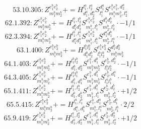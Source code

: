 \documentclass[letterpaper,10pt,fleqn,leqno,onecolumn]{article}
\begin{document}
\begin{equation} \;\;\;\;\;\;  53.10.305: Z^{e_{1}^{b}e_{2}^{b}}_{m_{1}^{b}m_{2}^{b}}+=H^{l_{1}^{a},l_{2}^{a}}_{d_{1}^{a},d_{2}^{a}}S^{d_{1}^{a}}_{l_{1}^{a}}S^{e_{1}^{b}e_{2}^{b},d_{2}^{a}}_{m_{1}^{b}m_{2}^{b},l_{2}^{a}} \end{equation}
\begin{equation} \;\;\;\;\;\;  62.1.392: Z^{e_{1}^{b}e_{2}^{b}}_{m_{1}^{b}m_{2}^{b}}+=H^{l_{1}^{b},l_{2}^{b}}_{d_{1}^{b}d_{2}^{b}}S^{e_{1}^{b}e_{2}^{b}}_{m_{1}^{b},l_{1}^{b}}S^{d_{1}^{b}d_{2}^{b}}_{m_{2}^{b},l_{2}^{b}}\cdot -1/1 \end{equation}
\begin{equation} \;\;\;\;\;\;  62.3.394: Z^{e_{1}^{b}e_{2}^{b}}_{m_{1}^{b}m_{2}^{b}}+=H^{l_{1}^{b},l_{1}^{a}}_{d_{1}^{a}d_{1}^{b}}S^{e_{1}^{b}e_{2}^{b}}_{m_{1}^{b},l_{1}^{b}}S^{d_{1}^{a}d_{1}^{b}}_{m_{2}^{b},l_{1}^{a}}\cdot -1/1 \end{equation}
\begin{equation} \;\;\;\;\;\;  63.1.400: Z^{e_{1}^{b}e_{2}^{b}}_{m_{1}^{b}m_{2}^{b}}+=H^{l_{1}^{b}l_{2}^{b}}_{d_{1}^{b}d_{2}^{b}}S^{e_{1}^{b}e_{2}^{b}}_{l_{1}^{b}l_{2}^{b}}S^{d_{1}^{b}d_{2}^{b}}_{m_{1}^{b}m_{2}^{b}} \end{equation}
\begin{equation} \;\;\;\;\;\;  64.1.403: Z^{e_{1}^{b}e_{2}^{b}}_{m_{1}^{b}m_{2}^{b}}+=H^{l_{1}^{b}l_{2}^{b}}_{d_{1}^{b},d_{2}^{b}}S^{e_{1}^{b},d_{1}^{b}}_{m_{1}^{b}m_{2}^{b}}S^{e_{2}^{b},d_{2}^{b}}_{l_{1}^{b}l_{2}^{b}}\cdot -1/1 \end{equation}
\begin{equation} \;\;\;\;\;\;  64.3.405: Z^{e_{1}^{b}e_{2}^{b}}_{m_{1}^{b}m_{2}^{b}}+=H^{l_{1}^{a}l_{1}^{b}}_{d_{1}^{b},d_{1}^{a}}S^{e_{1}^{b},d_{1}^{b}}_{m_{1}^{b}m_{2}^{b}}S^{e_{2}^{b},d_{1}^{a}}_{l_{1}^{a}l_{1}^{b}}\cdot -1/1 \end{equation}
\begin{equation} \;\;\;\;\;\;  65.1.411: Z^{e_{1}^{b}e_{2}^{b}}_{m_{1}^{b}m_{2}^{b}}+=H^{l_{1}^{b},l_{2}^{b}}_{d_{1}^{b},d_{2}^{b}}S^{e_{1}^{b},d_{1}^{b}}_{m_{1}^{b},l_{1}^{b}}S^{e_{2}^{b},d_{2}^{b}}_{m_{2}^{b},l_{2}^{b}}\cdot +1/2 \end{equation}
\begin{equation} \;\;\;\;\;\;  65.5.415: Z^{e_{1}^{b}e_{2}^{b}}_{m_{1}^{b}m_{2}^{b}}+=H^{l_{1}^{a},l_{1}^{b}}_{d_{1}^{a},d_{1}^{b}}S^{e_{1}^{b},d_{1}^{a}}_{m_{1}^{b},l_{1}^{a}}S^{e_{2}^{b},d_{1}^{b}}_{m_{2}^{b},l_{1}^{b}}\cdot 2/2 \end{equation}
\begin{equation} \;\;\;\;\;\;  65.9.419: Z^{e_{1}^{b}e_{2}^{b}}_{m_{1}^{b}m_{2}^{b}}+=H^{l_{1}^{a},l_{2}^{a}}_{d_{1}^{a},d_{2}^{a}}S^{e_{1}^{b},d_{1}^{a}}_{m_{1}^{b},l_{1}^{a}}S^{e_{2}^{b},d_{2}^{a}}_{m_{2}^{b},l_{2}^{a}}\cdot +1/2 \end{equation}
\end{document}
